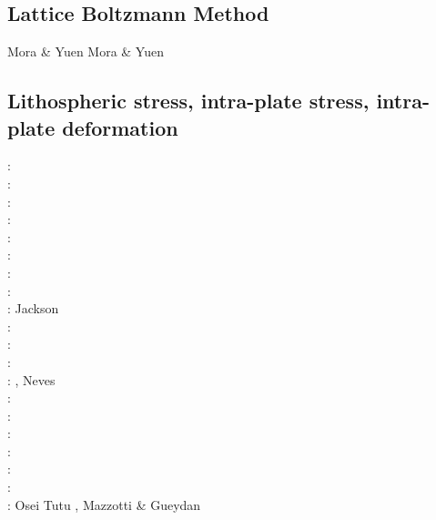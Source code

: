 \subsection{Lattice Boltzmann Method}

Mora \& Yuen \cite{moyu17}
Mora \& Yuen \cite{moyu18}


\subsection{Lithospheric stress, intra-plate stress, intra-plate deformation}

\begin{scriptsize}
\nineteenseventyfive: \cite{fouy75}\cite{sosr75}\\
\nineteenseventysix: \cite{riss76}\\
\nineteenseventyseven: \cite{chtu77}\\
\nineteenseventynine: \cite{riss79}\\
\nineteeneightynine: \cite{boww89}\\
\nineteenninetyone: \cite{worg91}\\
\nineteenninetytwo: \cite{rich92}\cite{wuvr92}\cite{zoba92}\cite{clko92}\\
\twothousandone: \cite{stsm01}\\
\twothousandtwo: Jackson \cite{jack02}\\
\twothousandfour: \cite{ligu04}\\
\twothousandfive: \cite{timr05}\\
\twothousandseven: \cite{hert07}\\
\twothousandeight: \cite{bilr08}\cite{ghhw08}, Neves \etal \cite{netv08}\\
\twothousandnine: \cite{ghhf09}\cite{nacl09}\\
\twothousandten: \cite{bepo10}\cite{yosh10}\\
\twothousandtwelve: \cite{nalr12}\cite{ghho12}\cite{wagw12}\\
\twothousandthirteen: \cite{ghhw13}\cite{wagw13}\\
\twothousandfourteen: \cite{vagw14}\\
\twothousandseventeen: \cite{grrb17}\\
\twothousandeighteen: Osei Tutu \etal \cite{osss18}, Mazzotti \& Gueydan \cite{magu18}
\end{scriptsize}

